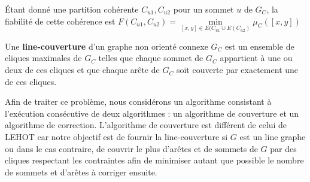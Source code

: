 \'Etant donn\'e une partition coh\'erente $C_{u1}, C_{u2}$ pour un sommet $u$ de $G_C$, la fiabilit\'e de cette coh\'erence est
$F(C_{u1}, C_{u2}) = \min\limits_{[x,y] \in E(C_{u1} \cup E(C_{u2} )}  \mu_{C}([x,y])$

\begin{definition}
\label{line-couverture}
Une {\bf line-couverture} d'un graphe non orient\'e connexe $G_C$ est un ensemble de cliques maximales de $G_C$ telles que chaque sommet de $G_C$ appartient \`a une ou deux de ces cliques et que chaque ar\^ete de $G_C$ soit couverte par exactement une de ces cliques.
\end{definition}

Afin de traiter ce probl\`eme, nous consid\'erons un algorithme consistant \`a l'ex\'ecution cons\'ecutive de deux algorithmes : un algorithme de couverture et un algorithme de correction. 
L'algorithme de couverture est diff\'erent de celui de LEHOT \cite{decompositionEnCliquesParArcs} car notre objectif est de fournir la line-couverture
 si $G$ est un line graphe ou dans le cas contraire, de couvrir le plus d'ar\^etes et de sommets de $G$ par des cliques respectant les contraintes afin de minimiser autant que possible le nombre de sommets et d'ar\^etes \`a corriger ensuite. 
 


